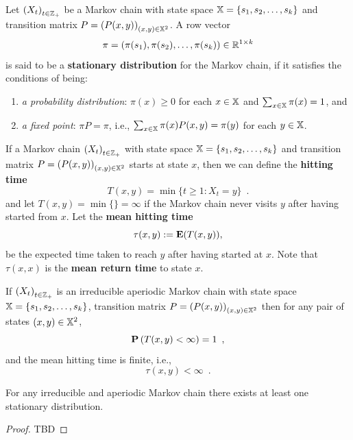 \begin{definition}
Let $\left( X_t \right)_{t \in \mathbb{Z}_+}$ be a Markov chain with state space $\mathbb{X}=\{s_1,s_2,\ldots,s_k\}$ and transition matrix $P = \left( P(x,y) \right)_{(x,y) \in \mathbb{X}^2}$.  A row vector $$\pi = \left( \pi(s_1), \pi(s_2), \ldots, \pi(s_k) \right) \in \mathbb{R}^{1\times k}$$ is said to be a {\bf stationary distribution} for the Markov chain, if it satisfies the conditions of being:
\begin{enumerate}
\item {\em a probability distribution}: $\pi(x) \geq 0$ for each $x \in \mathbb{X}$ and $\sum_{x \in \mathbb{X}} \pi(x) = 1$, and
\item {\em a fixed point}: $\pi P = \pi$, i.e., $\sum_{x \in \mathbb{X}} \pi(x) P(x,y) = \pi(y)$ for each $y \in \mathbb{X}$.
\end{enumerate}
\end{definition}

\begin{definition}
If a Markov chain $\left( X_t \right)_{t \in \mathbb{Z}_+}$ with state space $\mathbb{X}=\{s_1,s_2,\ldots,s_k\}$ and transition matrix $P = \left( P(x,y) \right)_{(x,y) \in \mathbb{X}^2}$ starts at state $x$, then we can define the {\bf hitting time}
\[
T(x,y) = \min \{ t \geq 1: X_t = y \} \enspace .
\]
and let $T(x,y) = \min \{\} = \infty$ if the Markov chain never visits $y$ after having started from $x$.  Let the {\bf  mean hitting time} 
\[
\tau(x,y) := \mathbf{E}(T(x,y)) ,
\]
be the expected time taken to reach $y$ after having started at $x$.  Note that $\tau(x,x)$ is the {\bf mean return time} to state $x$.
\end{definition}

\begin{prop}  
If  $\left( X_t \right)_{t \in \mathbb{Z}_+}$ is an irreducible aperiodic Markov chain with state space $\mathbb{X}=\{s_1,s_2,\ldots,s_k\}$, transition matrix $P = \left( P(x,y) \right)_{(x,y) \in \mathbb{X}^2}$ then for any pair of states ${(x,y) \in \mathbb{X}^2}$,
\[
\mathbf{P}\left( T(x,y) < \infty \right) = 1 \enspace ,
\]
and the mean hitting time is finite, i.e.,
\[
\tau(x,y) < \infty \enspace .
\]
\end{prop}

\begin{prop}
For any irreducible and aperiodic Markov chain there exists at least one stationary distribution.
\begin{proof}
TBD
\end{proof}
\end{prop}

